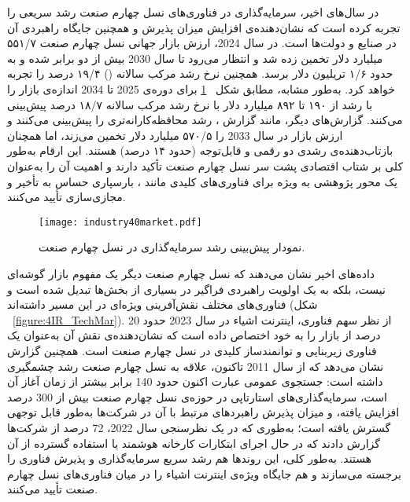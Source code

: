 در سال‌های اخیر، سرمایه‌گذاری در فناوری‌های نسل چهارم صنعت رشد سریعی را تجربه کرده است که نشان‌دهنده‌ی افزایش میزان پذیرش و همچنین جایگاه راهبردی آن در صنایع و دولت‌ها است. در سال 2024، ارزش بازار جهانی نسل چهارم صنعت ۵۵۱/۷ میلیارد دلار تخمین زده شد و انتظار می‌رود تا سال 2030 بیش از دو برابر شده و به حدود ۱/۶ تریلیون دلار برسد. همچنین نرخ رشد مرکب سالانه () ۱۹/۴ درصد را تجربه خواهد کرد\cite{RnM2025GlobMar}. به‌طور مشابه، مطابق شکل ~\ref{figure:4IR_Mar} برای دوره‌ی 2025 تا 2034 اندازه‌ی بازار را با رشد از ۱۹۰ تا ۸۹۲ میلیارد دلار با نرخ رشد مرکب سالانه ۱۸/۷ درصد پیش‌بینی می‌کنند\cite{StatiFacts2025GlobMar}. گزارش‌های دیگر، مانند گزارش  \cite{IMARC2025GlobInd}، رشد محافظه‌کارانه‌تری را پیش‌بینی می‌کنند و ارزش بازار در سال 2033 را ۵۷۰/۵ میلیارد دلار تخمین می‌زند، اما همچنان بازتاب‌دهنده‌ی رشدی دو رقمی و قابل‌توجه  (حدود ۱۴ درصد)  هستند. این ارقام به‌طور کلی بر شتاب اقتصادی پشت سر نسل چهارم صنعت تأکید دارند و اهمیت آن را به‌عنوان یک محور پژوهشی به ‌ویژه برای فناوری‌های کلیدی مانند ، بارسپاری حساس به تأخیر و مجازی‌سازی تأیید می‌کنند.

\vspace{0.5cm}
\begin{figure}[h]
\centering
\texttt{[image: industry40market.pdf]}
\caption{نمودار پیش‌بینی رشد سرمایه‌گذاری در نسل چهارم صنعت\cite{StatiFacts2025GlobMar}.}
\label{figure:4IR_Mar}
\end{figure}
\vspace{0.5cm}

داده‌های اخیر نشان می‌دهند که نسل چهارم صنعت دیگر یک مفهوم بازار گوشه‌ای نیست، بلکه به یک اولویت راهبردی فراگیر در بسیاری از بخش‌ها تبدیل شده است و فناوری‌های مختلف نقش‌آفرینی ویژه‌ای در این مسیر داشته‌اند (شکل ~\ref{figure:4IR_TechMar}). از نظر سهم فناوری، اینترنت اشیاء  در سال 2023 حدود 20 درصد از بازار را به خود اختصاص داده است که نشان‌دهنده‌ی نقش آن به‌عنوان یک فناوری زیربنایی و توانمندساز کلیدی در نسل چهارم صنعت است\cite{GM2025Rise}. همچنین گزارش  نشان می‌دهد\cite{IoTAnal2025Rise} که از سال 2011 تاکنون، علاقه به نسل چهارم صنعت رشد چشمگیری داشته است: جستجوی عمومی عبارت  اکنون حدود 140 برابر بیشتر از زمان آغاز آن است، سرمایه‌گذاری‌های استارتاپی در حوزه‌ی نسل چهارم صنعت بیش از 300 درصد افزایش یافته، و میزان پذیرش راهبردهای مرتبط با آن در شرکت‌ها به‌طور قابل توجهی گسترش یافته است؛ به‌طوری که در یک نظرسنجی سال 2022، 72 درصد از شرکت‌ها گزارش دادند که در حال اجرای ابتکارات کارخانه هوشمند  یا استفاده گسترده از آن هستند. به‌طور کلی، این روندها هم رشد سریع سرمایه‌گذاری و پذیرش فناوری را برجسته می‌سازند و هم جایگاه ویژه‌ی اینترنت اشیاء را در میان فناوری‌های نسل چهارم صنعت تأیید می‌کنند.

